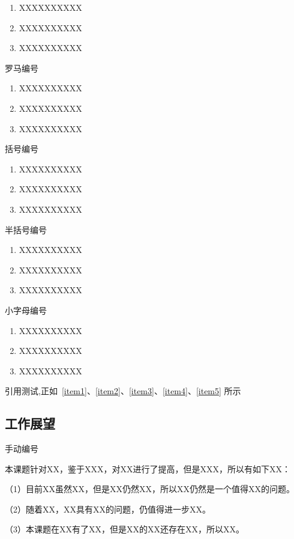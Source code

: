 \begin{enumerate}
 \item XXXXXXXXXX
 \label{item1}
 \item XXXXXXXXXX
 \item XXXXXXXXXX
\end{enumerate}
罗马编号
\begin{enumerate}[label=(\roman*)]
 \item XXXXXXXXXX
 \label{item2}
 \item XXXXXXXXXX
 \item XXXXXXXXXX
\end{enumerate}
括号编号
\begin{enumerate}[label=(\arabic*)]
 \item XXXXXXXXXX
 \label{item3}
 \item XXXXXXXXXX
 \item XXXXXXXXXX
\end{enumerate}
半括号编号
\begin{enumerate}[label=\arabic*)]
 \item XXXXXXXXXX
 \label{item4}
 \item XXXXXXXXXX
 \item XXXXXXXXXX
\end{enumerate}
小字母编号
\begin{enumerate}[label=\alph*)]
 \item XXXXXXXXXX
 \label{item5}
 \item XXXXXXXXXX
 \item XXXXXXXXXX
\end{enumerate}

引用测试,正如~\ref{item1}、\ref{item2}、\ref{item3}、\ref{item4}、\ref{item5} 所示

\subsection{工作展望}
手动编号 %

本课题针对XX，鉴于XXX，对XX进行了提高，但是XXX，所以有如下XX：

（1）目前XX虽然XX，但是XX仍然XX，所以XX仍然是一个值得XX的问题。

（2）随着XX，XX具有XX的问题，仍值得进一步XX。

（3）本课题在XX有了XX，但是XX的XX还存在XX，所以XX。


\newpage
